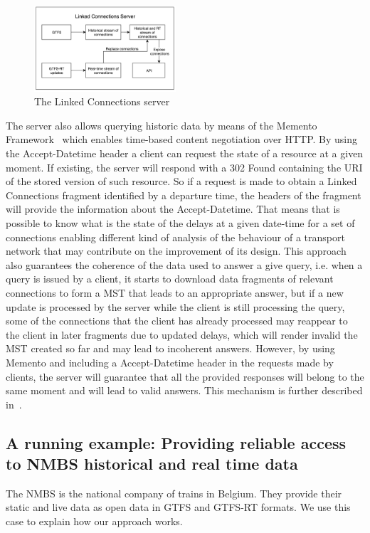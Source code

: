 \documentclass[sw]{iosart2x}
\begin{document}
	\begin{figure}[t]
		\includegraphics[width=0.47\textwidth]{images/lc_server.png}
		\caption{The Linked Connections server}\label{fig:lc_server}
	\end{figure}
	
	The server also allows querying historic data by means of the Memento Framework~\cite{van2010http} which enables time-based content negotiation over HTTP. By using the Accept-Datetime header a client can request the state of a resource at a given moment. If existing, the server will respond with a 302 Found containing the URI of the stored version of such resource. So if a request is made to obtain a Linked Connections fragment identified by a departure time, the headers of the fragment will provide the information about the Accept-Datetime. That means that is possible to know what is the state of the delays at a given date-time for a set of connections enabling different kind of analysis of the behaviour of a transport network that may contribute on the improvement of its design. This approach also guarantees the coherence of the data used to answer a give query, i.e. when a query is issued by a client, it starts to download data fragments of relevant connections to form a MST that leads to an appropriate answer, but if a new update is processed by the server while the client is still processing the query, some of the connections that the client has already processed may reappear to the client in later fragments due to updated delays, which will render invalid the MST created so far and may lead to incoherent answers. However, by using Memento and including a Accept-Datetime header in the requests made by clients, the server will guarantee that all the provided responses will belong to the same moment and will lead to valid answers. This mechanism is further described in~\cite{rojas2017providing}.    
	
	\subsection{A running example: Providing reliable access to NMBS historical and real time data}
	The NMBS is the national company of trains in Belgium. They provide their static and live data as open data in GTFS and GTFS-RT formats. We use this case to explain how our approach works.
	
\end{document}
